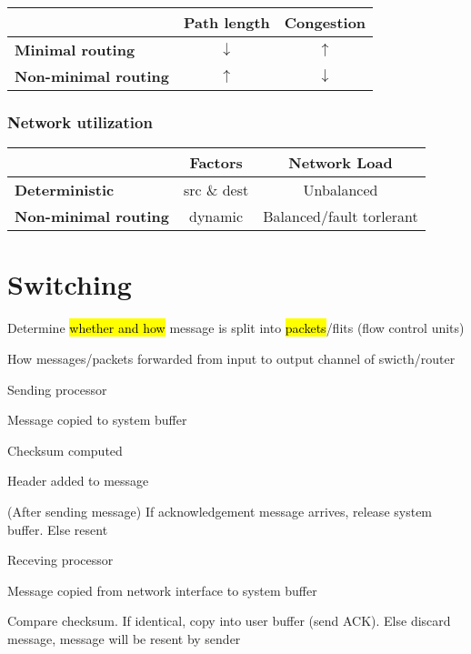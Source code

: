 \documentclass[12pt]{article}
\begin{document}
\begin{spacing}{1.5}
\begin{tabular}{l | cc}
& \textbf{Path length} & \textbf{Congestion} \\ 
\hline
\textbf{Minimal routing} & $\downarrow$ & $\uparrow$ \\
\textbf{Non-minimal routing} & $\uparrow$ & $\downarrow$ 
\end{tabular}

\subsubsection{Network utilization}

\begin{tabular}{l | cc}
& \textbf{Factors} & \textbf{Network Load} \\ 
\hline
\textbf{Deterministic} & src \& dest & Unbalanced \\
\textbf{Non-minimal routing} & dynamic & Balanced/fault torlerant 
\end{tabular}

\section{Switching}

\begin{itemize*}
	\item Determine \hl{whether and how} message is split into \hl{packets}/flits (flow control units)
	\item How messages/packets forwarded from input to output channel of swicth/router
\end{itemize*}

Sending processor

\begin{itemize*}
	\item Message copied to system buffer
	\item Checksum computed
	\item Header added to message
	\item (After sending message) If acknowledgement message arrives, release system buffer. Else resent
\end{itemize*}

Receving processor

\begin{itemize*}
	\item Message copied from network interface to system buffer
	\item Compare checksum. If identical, copy into user buffer (send ACK). Else discard message, message will be resent by sender
\end{itemize*}


\end{spacing}
\end{document}
